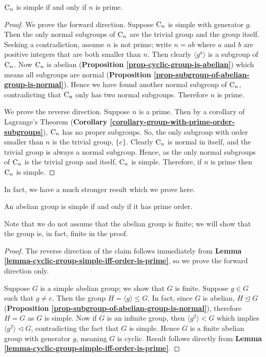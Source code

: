 \begin{lemma}\label{lemma-cyclic-group-simple-iff-order-is-prime}
    $\mathrm{C}_{n}$ is simple if and only if $n$ is prime.
\end{lemma}

\begin{proof}
    We prove the forward direction. Suppose $\mathrm{C}_{n}$ is simple with generator $g$. Then the only normal subgroups of $\mathrm{C}_{n}$ are the trivial group and the group itself. Seeking a contradiction, assume $n$ is not prime; write $n = ab$ where $a$ and $b$ are positive integers that are both smaller than $n$. Then clearly $\langle g^a\rangle$ is a subgroup of $\mathrm{C}_{n}$. Now $\mathrm{C}_{n}$ is abelian (\textbf{Proposition \ref{prop-cyclic-group-is-abelian}}) which means all subgroups are normal (\textbf{Proposition \ref{prop-subgroup-of-abelian-group-is-normal}}). Hence we have found another normal subgroup of $\mathrm{C}_{n}$, contradicting that $\mathrm{C}_{n}$ only has two normal subgroups. Therefore $n$ is prime.
    
    We prove the reverse direction. Suppose $n$ is a prime. Then by a corollary of Lagrange's Theorem (\textbf{Corollary \ref{corollary-group-with-prime-order-subgroups}}), $\mathrm{C}_{n}$ has no proper subgroups. So, the only subgroup with order smaller than $n$ is the trivial group, $\{e\}$. Clearly $\mathrm{C}_{n}$ is normal in itself, and the trivial group is always a normal subgroup. Hence, as the only normal subgroups of $\mathrm{C}_{n}$ is the trivial group and itself, $\mathrm{C}_{n}$ is simple. Therefore, if $n$ is prime then $\mathrm{C}_{n}$ is simple.
\end{proof}

In fact, we have a much stronger result which we prove here.
\begin{theorem}\label{thrm-abelian-group-simple-iff-cylic-group-of-prime-order}
    An abelian group is simple if and only if it has prime order.
\end{theorem}
Note that we do not assume that the abelian group is finite; we will show that the group is, in fact, finite in the proof.
\begin{proof}
    The reverse direction of the claim follows immediately from \textbf{Lemma \ref{lemma-cyclic-group-simple-iff-order-is-prime}}, so we prove the forward direction only.
    
    Suppose $G$ is a simple abelian group; we show that $G$ is finite. Suppose $g \in G$ such that $g \neq e$. Then the group $H = \langle g \rangle \leq G$. In fact, since $G$ is abelian, $H \unlhd G$ (\textbf{Proposition \ref{prop-subgroup-of-abelian-group-is-normal}}), therefore $H = G$ as $G$ is simple. Now if $G$ is an infinite group, then $\langle g^2 \rangle < G$ which implies $\langle g^2 \rangle \lhd G$, contradicting the fact that $G$ is simple. Hence $G$ is a finite abelian group with generator $g$, meaning $G$ is cyclic. Result follows directly from \textbf{Lemma \ref{lemma-cyclic-group-simple-iff-order-is-prime}}.
\end{proof}

